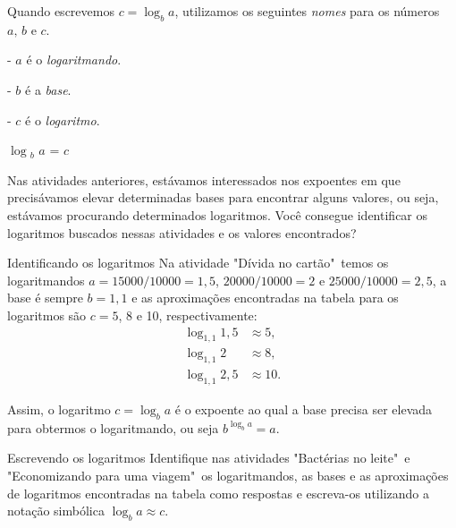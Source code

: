 \begin{observation}
Quando escrevemos $c = \log_b a$, utilizamos os seguintes \textit{nomes} para os números $a,\,b$ e $c$.
\begin{center}
\begin{minipage}{0.3\linewidth}
\begin{flushleft}
- \textcolor{penlaranja}{$a$} é o \textcolor{penlaranja}{\textit{logaritmando}}.

- \textcolor{penaqua}{$b$} é a \textcolor{penaqua}{\textit{base}}.

- \textcolor{penazul}{$c$} é o \textcolor{penazul}{\textit{logaritmo}}.

\end{flushleft}
\end{minipage}
\begin{minipage}{0.3\linewidth}

\Huge $\log$\textcolor{penaqua}{$_b$} \textcolor{penlaranja}{$a$} = \textcolor{penazul}{$c$}

\end{minipage}
\end{center}
\end{observation}


Nas atividades anteriores, estávamos interessados nos expoentes em que precisávamos elevar determinadas bases para encontrar alguns valores, ou seja, estávamos procurando determinados logaritmos. Você consegue identificar os logaritmos buscados nessas atividades e os valores encontrados?  

\begin{example}{Identificando os logaritmos}
Na atividade "Dívida no cartão"\, temos os logaritmandos $a=15000/10000=1,5$, $20000/10000=2$ e $25000/10000=2,5$, a base é sempre $b= 1,1$ e as aproximações encontradas na tabela para os logaritmos são $c= 5$, 8 e 10, respectivamente:
\begin{align*}
\log_{1,1} 1,5 &\approx 5,\\ 
\log_{1,1} 2 &\approx 8,\\
\log_{1,1} 2,5 &\approx 10.
\end{align*}
\end{example}


\begin{observation}
Assim, o logaritmo $c = \log_b a$ é o expoente ao qual a base precisa ser elevada para obtermos o logaritmando, ou seja $b^{\log_b a}=a$.
\end{observation}


\begin{task}{Escrevendo os logaritmos}
Identifique nas atividades "Bactérias no leite"\, e "Economizando para uma viagem"\, os logaritmandos, as bases e as aproximações de logaritmos encontradas na tabela como respostas e escreva-os utilizando a notação simbólica $\log_b a \approx c$.
\end{task}


